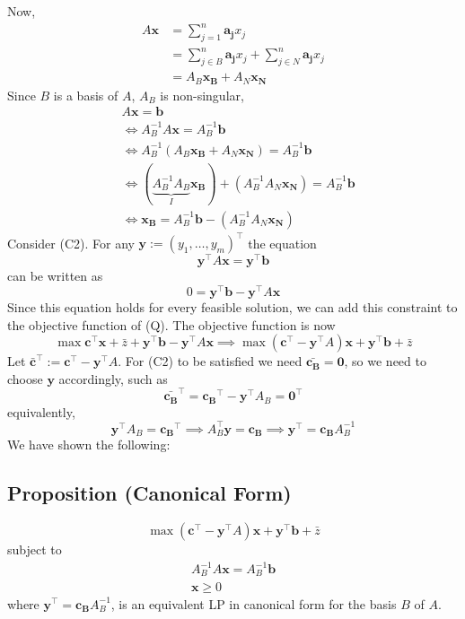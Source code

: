 Now,
\begin{align*}
    A\mathbf{x}
    &=\sum_{j = 1}^{n}\mathbf{a_j}x_j\\
    &=\sum_{j\in B}^{n}\mathbf{a_j}x_j+\sum_{j\in N}^{n}\mathbf{a_j}x_j\\
    &=A_B \mathbf{x_B}+A_N \mathbf{x_N}
\end{align*}
Since $B$ is a basis of $A$, $A_B$ is non-singular,
\begin{align*}
    &A\mathbf{x}=\mathbf{b}\\
    &\iff
    A_B^{-1}A\mathbf{x}=A_B^{-1}\mathbf{b}\\
    &\iff
    A_B^{-1}(A_B\mathbf{x_B}+A_N\mathbf{x_N})=A_B^{-1}\mathbf{b}\\
    &\iff
    (\underbrace{A_B^{-1} A_B}_{I}\mathbf{x_B})+
    (A_B^{-1} A_N\mathbf{x_N})=A_B^{-1}\mathbf{b}\\
    &\iff
    \mathbf{x_B}=A_B^{-1}\mathbf{b}-(A_B^{-1} A_N\mathbf{x_N})
\end{align*}
Consider (C2). For any $\mathbf{y}:=(y_1,\dots, y_m)^\top$
the equation
\[\mathbf{y}^\top A\mathbf{x}=\mathbf{y}^\top \mathbf{b}\]
can be written as
\[0=\mathbf{y}^\top \mathbf{b}-\mathbf{y}^\top A\mathbf{x}\]
Since  this  equation  holds  for  every  feasible  solution,  we  can  add  this 
constraint to the objective function of (Q). The objective function is now
\[\max \mathbf{c}^\top  \mathbf{x}+\bar{z}+\mathbf{y}^\top \mathbf{b}-\mathbf{y}^\top A\mathbf{x}
\implies
\max (\mathbf{c}^\top -\mathbf{y}^\top A)\mathbf{x}+\mathbf{y}^\top \mathbf{b}+\bar{z}\]
Let $\mathbf{\bar{c}}^\top :=\mathbf{c}^\top -\mathbf{y}^\top A$. For (C2) to be satisfied we need
$\mathbf{\bar{c_B}}=\mathbf{0}$, so we need to choose $\mathbf{y}$ accordingly, such as
\[\mathbf{\bar{c_B}}^\top =\mathbf{c_B}^\top -\mathbf{y}^\top A_B=\mathbf{0}^\top \]
equivalently,
\[\mathbf{y}^\top A_B=\mathbf{c_B}^\top 
\implies
A_B^\top \mathbf{y}=\mathbf{c_B}
\implies
\mathbf{y}^\top =\mathbf{c_B}A_B^{-1}\]
We have shown the following:


\begin{thmbox}
    \subsection{Proposition (Canonical Form)}
    \[\max (\mathbf{c}^\top -\mathbf{y}^\top A)\mathbf{x}+\mathbf{y}^\top \mathbf{b}+\bar{z}\]
    subject to
    \begin{align*}
        A_B^{-1}A\mathbf{x}=A_B^{-1}\mathbf{b}\\
        \mathbf{x}\ge 0
    \end{align*}
    where $\mathbf{y}^\top =\mathbf{c_B}A_B^{-1}$, is an equivalent LP in canonical form for the 
    basis $B$ of $A$.
\end{thmbox}


